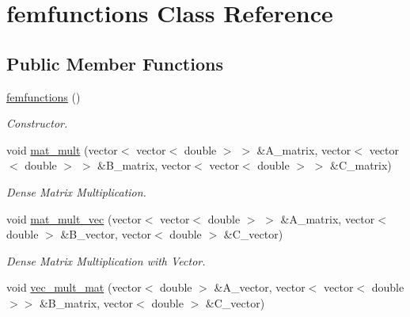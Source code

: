 \hypertarget{classfemfunctions}{
\section{femfunctions Class Reference}
\label{classfemfunctions}
}
\subsection*{Public Member Functions}
\begin{DoxyCompactItemize}
\item 
\hypertarget{classfemfunctions_afac199029f528c9f26cd5137cf4a077c}{
\hyperlink{classfemfunctions_afac199029f528c9f26cd5137cf4a077c}{femfunctions} ()}
\label{classfemfunctions_afac199029f528c9f26cd5137cf4a077c}

\begin{DoxyCompactList}\small\item\em Constructor. \item\end{DoxyCompactList}\item 
\hypertarget{classfemfunctions_a732c27a3e85fa5508922b36522be426f}{
void \hyperlink{classfemfunctions_a732c27a3e85fa5508922b36522be426f}{mat\_\-mult} (vector$<$ vector$<$ double $>$ $>$ \&A\_\-matrix, vector$<$ vector$<$ double $>$ $>$ \&B\_\-matrix, vector$<$ vector$<$ double $>$ $>$ \&C\_\-matrix)}
\label{classfemfunctions_a732c27a3e85fa5508922b36522be426f}

\begin{DoxyCompactList}\small\item\em Dense Matrix Multiplication. \item\end{DoxyCompactList}\item 
\hypertarget{classfemfunctions_aa9860f9dc5bb1ea5d5b2a765af56a22b}{
void \hyperlink{classfemfunctions_aa9860f9dc5bb1ea5d5b2a765af56a22b}{mat\_\-mult\_\-vec} (vector$<$ vector$<$ double $>$ $>$ \&A\_\-matrix, vector$<$ double $>$ \&B\_\-vector, vector$<$ double $>$ \&C\_\-vector)}
\label{classfemfunctions_aa9860f9dc5bb1ea5d5b2a765af56a22b}

\begin{DoxyCompactList}\small\item\em Dense Matrix Multiplication with Vector. \item\end{DoxyCompactList}\item 
\hypertarget{classfemfunctions_af02c924fb387e0365590de03bbc189df}{
void \hyperlink{classfemfunctions_af02c924fb387e0365590de03bbc189df}{vec\_\-mult\_\-mat} (vector$<$ double $>$ \&A\_\-vector, vector$<$ vector$<$ double $>$$>$ \&B\_\-matrix, vector$<$ double $>$ \&C\_\-vector)}
\label{classfemfunctions_af02c924fb387e0365590de03bbc189df}


\end{DoxyCompactItemize}
